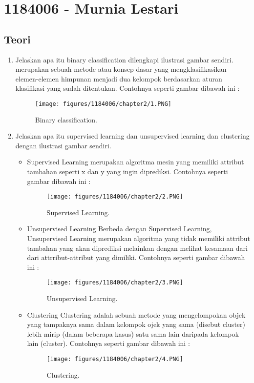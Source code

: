\section{1184006 - Murnia Lestari}
\subsection{Teori}
\begin{enumerate}

	\item Jelaskan apa itu binary classification dilengkapi ilustrasi gambar sendiri.
	\hfill\break
merupakan sebuah metode atau konsep dasar yang mengklasifikasikan elemen-elemen himpunan menjadi dua kelompok berdasarkan aturan klasifikasi yang sudah ditentukan. Contohnya seperti gambar dibawah ini :

	\begin{figure}[h]
	\centering
		\texttt{[image: figures/1184006/chapter2/1.PNG]}
		\caption{Binary classification.}
	\end{figure}

	\item Jelaskan apa itu supervised learning dan unsupervised learning dan clustering dengan ilustrasi gambar sendiri.
	\hfill\break

	\begin{itemize}
		\item Supervised Learning
		\hfill\break merupakan algoritma mesin yang memiliki attribut tambahan seperti x dan y yang ingin diprediksi. Contohnya seperti gambar dibawah ini :
		
		\begin{figure}[h]
		\centering
			\texttt{[image: figures/1184006/chapter2/2.PNG]}
			\caption{Supervised Learning.}
		\end{figure}

		\newpage\item Unsupervised Learning 
		\hfill\break
		Berbeda dengan Supervised Learning, Unsupervised Learning  merupakan algoritma yang tidak memiliki attribut tambahan yang akan diprediksi melainkan dengan melihat kesamaan dari dari attrribut-attribut yang dimiliki. Contohnya seperti gambar dibawah ini :


		\begin{figure}[h]
		\centering
			\texttt{[image: figures/1184006/chapter2/3.PNG]}
			\caption{Unsupervised Learning.}
		\end{figure}

		\item Clustering
		\hfill\break
		Clustering adalah sebuah metode yang mengelompokan  objek yang tampaknya sama dalam kelompok  ojek yang sama (disebut cluster) lebih mirip (dalam beberapa kasus) satu sama lain daripada kelompok lain (cluster). Contohnya seperti gambar dibawah ini :
		\begin{figure}[h]
		\centering
			\texttt{[image: figures/1184006/chapter2/4.PNG]}
			\caption{Clustering.}
		\end{figure}
	\end{itemize}
	

\end{enumerate}
